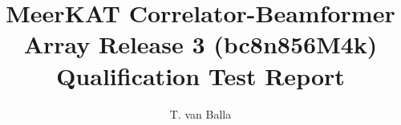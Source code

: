\documentclass[11pt,english,twoside]{article}
\author{T. van Balla}
\begin{document}
\title{MeerKAT Correlator-Beamformer Array Release 3  (bc8n856M4k) Qualification Test Report}
\makekatdocbeginning
\end{document}
